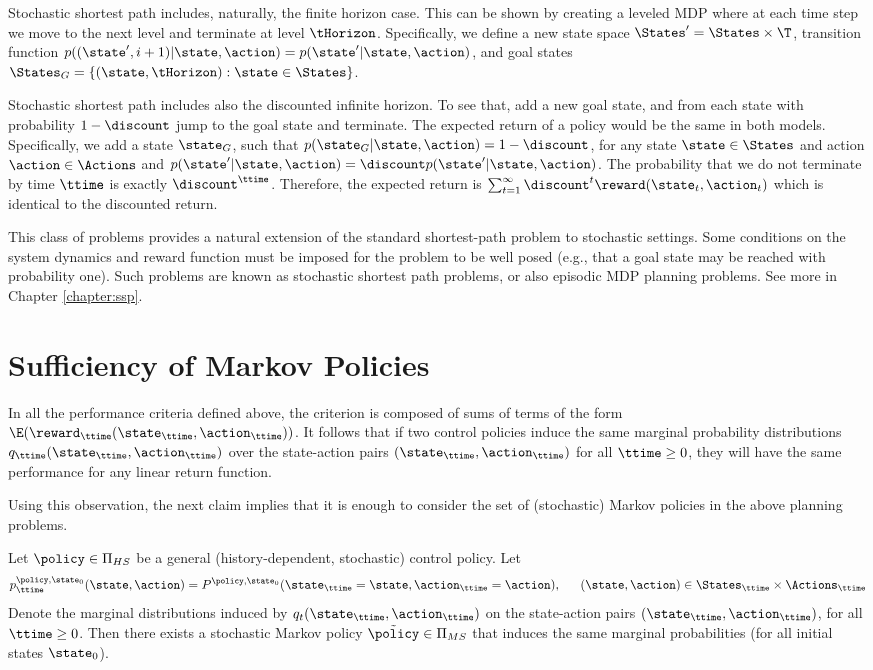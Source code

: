 Stochastic shortest path includes, naturally, the finite horizon case. This can be shown by creating a leveled MDP where at each time step we move to the next level and terminate at level $\tHorizon$.
Specifically, we define a new state space $\States'=\States\times \T$, transition function $p((\state',i+1)|\state,\action)=p(\state'|\state,\action)$, and goal states $\States_G=\{(\state,\tHorizon):\state \in\States\}$.

Stochastic shortest path includes also the discounted infinite
horizon. To see that, add a new goal state, and from each state with
probability $1-\discount$ jump to the goal state and terminate. The
expected return of a policy would be the same in both models.
Specifically, we add a state $\state_G$, such that
$p(\state_G|\state,\action)=1-\discount$, for any state
$\state\in\States$ and action $\action\in\Actions$ and
$p(\state'|\state,\action)=\discount p(\state'|\state,\action)$. The
probability that we do not terminate by time $\ttime$ is exactly
$\discount^\ttime$. Therefore, the expected return is
$\sum_{t=1}^\infty \discount^t\reward(\state_t,\action_t)$ which is
identical to the discounted return.

This class of problems provides a natural extension of the standard
shortest-path problem to stochastic settings.  Some conditions on
the system dynamics and reward function must be imposed for the
problem to be well posed (e.g., that a goal state may be reached
with probability one). Such problems are known as stochastic
shortest path problems, or also episodic MDP planning problems. See
more in Chapter \ref{chapter:ssp}.

\section{Sufficiency of Markov Policies}
In all the performance criteria defined above, the criterion is
composed of sums of terms of the form
$\E({\reward_\ttime}({\state_\ttime},{\action_\ttime}))$. It follows
that if two control policies induce the same marginal probability
distributions ${q_\ttime}({\state_\ttime},{\action_\ttime})$ over
the state-action pairs $({\state_\ttime},{\action_\ttime})$ for all
$\ttime \ge 0$, they will have the same performance for any linear
return function.

Using this observation, the next claim implies that it is enough to
consider the set of (stochastic) Markov policies in the above
planning problems.

\begin{proposition}\label{prop:sufficient} Let  $\policy  \in {\Pi _{HS}}$ be a general (history-dependent, stochastic) control policy.  Let
\[p_\ttime^{\policy ,{\state_0}}(\state,\action) = {P^{\policy ,{\state_0}}}({\state_\ttime} = \state,{\action_\ttime} = \action),\quad \;\;(\state,\action) \in {\States_\ttime} \times {\Actions_\ttime}\]
Denote the marginal distributions induced by
$q_t({\state_\ttime},{\action_\ttime})$ on the state-action pairs
$({\state_\ttime},{\action_\ttime})$, for all $\ttime \ge 0$. Then there
exists a stochastic Markov policy $\tilde \policy \in {\Pi_{MS}}$
that induces the same marginal probabilities (for all initial states
${\state_0}$).
\end{proposition}


